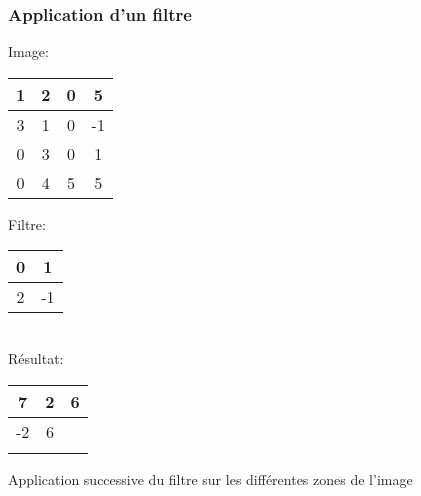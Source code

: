 \documentclass{formation}
\begin{document}
\begin{frame}
  \frametitle{Application d'un filtre}
  \begin{multicols}{2}
    Image:
    \begin{tabular}{|c|c|c|c|}
      \hline
      1 & 2 & 0 & 5 \\
      \hline
      3 & \cellcolor{green}1 & \cellcolor{green}0 & -1 \\
      \hline
      0 & \cellcolor{green}3 & \cellcolor{green}0 & 1 \\
      \hline
      0 & 4 & 5 & 5 \\
      \hline
    \end{tabular}

    \columnbreak

    Filtre:
    \begin{tabular}{|c|c|}
      \hline
      0 & 1  \\
      \hline
      2 & -1 \\
      \hline
    \end{tabular}\\[.5cm]
    Résultat:
    \begin{tabular}{|c|c|c|}
      \hline
      7 & 2 & 6\\
      \hline
      -2 & 6 &  \phantom{-2}\\
      \hline
        &  & \\
      \hline
    \end{tabular}
  \end{multicols}
  Application successive du filtre sur les différentes zones de l'image
\end{frame}
\end{document}
